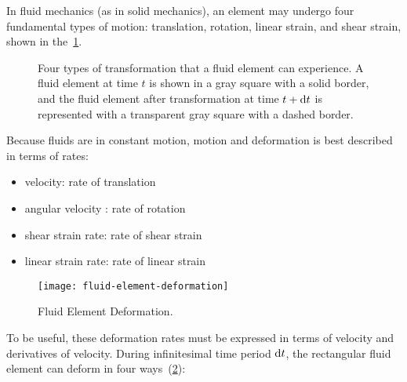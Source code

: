 In fluid mechanics (as in solid mechanics), an element may undergo four fundamental types of motion: translation, rotation, linear strain, and shear strain, shown in the~\cref{fig:fluid-element-types-of-transormations}.
%
\begin{figure}[H]
  \centering
  \caption{Four types of transformation that a fluid element can experience. A fluid element at time \(t\) is shown in a gray square with a solid border, and the fluid element after transformation at time \(t + \mathop{}\!\mathrm{d} t\) is represented with a transparent gray square with a dashed border.}
  \label{fig:fluid-element-types-of-transormations}
\end{figure}
%
Because fluids are in constant motion, motion and deformation is best described in terms of rates:
%
\begin{itemize}
  \item velocity: rate of translation
  \item angular velocity : rate of rotation
  \item shear strain rate: rate of shear strain
  \item linear strain rate: rate of linear strain
\end{itemize}
%
\begin{figure}[H]
  \centering
  \texttt{[image: fluid-element-deformation]}
  \caption{Fluid Element Deformation.}
  \label{fig:fluid-element-deformation}
\end{figure}
%
To be useful, these deformation rates must be expressed in terms of velocity and derivatives of velocity.
During infinitesimal time period \(\mathop{}\!\mathrm{d} t\), the rectangular fluid element can deform in four ways~(\cref{fig:fluid-element-deformation}):
%
